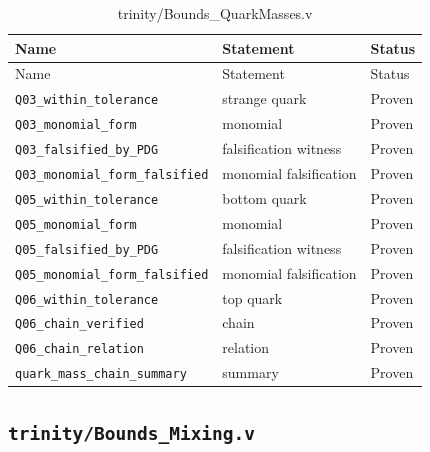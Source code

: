 \begin{longtable}{lll}
\toprule
Name & Statement & Status \\
\midrule
\endfirsthead
\toprule
Name & Statement & Status \\
\midrule
\endhead
\bottomrule
\endfoot
\bottomrule
\caption{trinity/Bounds\_QuarkMasses.v}
\endlastfoot
\texttt{Q03\_within\_tolerance} & strange quark & Proven \\
\texttt{Q03\_monomial\_form} & monomial & Proven \\
\texttt{Q03\_falsified\_by\_PDG} & falsification witness & Proven \\
\texttt{Q03\_monomial\_form\_falsified} & monomial falsification & Proven \\
\texttt{Q05\_within\_tolerance} & bottom quark & Proven \\
\texttt{Q05\_monomial\_form} & monomial & Proven \\
\texttt{Q05\_falsified\_by\_PDG} & falsification witness & Proven \\
\texttt{Q05\_monomial\_form\_falsified} & monomial falsification & Proven \\
\texttt{Q06\_within\_tolerance} & top quark & Proven \\
\texttt{Q06\_chain\_verified} & chain & Proven \\
\texttt{Q06\_chain\_relation} & relation & Proven \\
\texttt{quark\_mass\_chain\_summary} & summary & Proven \\
\end{longtable}

\subsection{\texttt{trinity/Bounds\_Mixing.v}}
\label{sec:A-coq-mixing}

